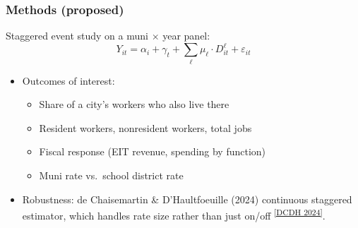 \documentclass[xcolor = x11names, compress, aspectratio = 169]{beamer}
\newcommand{\src}[2]{\textsuperscript{\href{#1}{\footnotesize[#2]}}}
\begin{document}
\begin{frame}
\frametitle{Methods (proposed)}
    \small
    Staggered event study on a muni $\times$ year panel:
    \[
        Y_{it} = \alpha_i + \gamma_t
                 + \sum_{\ell} \mu_\ell \cdot D_{it}^{\ell}
                 + \varepsilon_{it}
    \]
    \begin{itemize}\setlength{\itemsep}{0.2cm}
        \item Outcomes of interest:
        \begin{itemize}\setlength{\itemsep}{0.04cm}
            \item Share of a city's workers who also live there
            \item Resident workers, nonresident workers, total jobs
            \item Fiscal response (EIT revenue, spending by function)
            \item Muni rate vs.\ school district rate
        \end{itemize}
        \item Robustness: de Chaisemartin \& D'Haultfoeuille (2024)
        continuous staggered estimator, which handles rate size
        rather than just on/off
        \src{https://doi.org/10.3982/ECTA19039}{DCDH 2024}.
    \end{itemize}
\end{frame}
\end{document}
